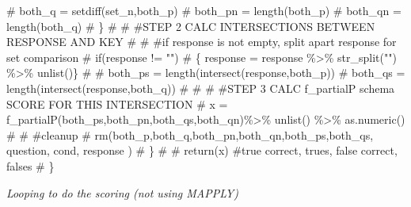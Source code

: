 \documentclass[
  letterpaper,
  DIV=11,
  numbers=noendperiod]{scrreprt}
\newenvironment{Shaded}{\begin{snugshade}}{\end{snugshade}}
\newcommand{\CommentTok}[1]{\textcolor[rgb]{0.37,0.37,0.37}{#1}}
\begin{document}
\begin{Shaded}
\begin{Highlighting}[]
\CommentTok{\#      both\_q = setdiff(set\_n,both\_p)}
\CommentTok{\#      both\_pn = length(both\_p)}
\CommentTok{\#      both\_qn = length(both\_q)}
\CommentTok{\#   \}}
\CommentTok{\#     }
\CommentTok{\#   \#STEP 2 CALC INTERSECTIONS BETWEEN RESPONSE AND KEY}
\CommentTok{\#   }
\CommentTok{\#   \#if response is not empty, split apart response for set comparison}
\CommentTok{\#     if(response != "")}
\CommentTok{\#     \{ response = response \%\textgreater{}\% str\_split("") \%\textgreater{}\% unlist()\}}
\CommentTok{\#   }
\CommentTok{\#     both\_ps = length(intersect(response,both\_p))}
\CommentTok{\#     both\_qs = length(intersect(response,both\_q))}
\CommentTok{\#   }
\CommentTok{\#  }
\CommentTok{\#   \#STEP 3 CALC f\_partialP schema SCORE FOR THIS INTERSECTION }
\CommentTok{\#   x = f\_partialP(both\_ps,both\_pn,both\_qs,both\_qn)\%\textgreater{}\% unlist() \%\textgreater{}\% as.numeric()}
\CommentTok{\#   }
\CommentTok{\#   \#cleanup}
\CommentTok{\#   rm(both\_p,both\_q,both\_pn,both\_qn,both\_ps,both\_qs, question, cond, response )   }
\CommentTok{\#   \}}
\CommentTok{\#   }
\CommentTok{\#   return(x) \#true correct, trues, false correct, falses}
\CommentTok{\# \}}
\end{Highlighting}
\end{Shaded}

\emph{Looping to do the scoring (not using MAPPLY)}
\end{document}
